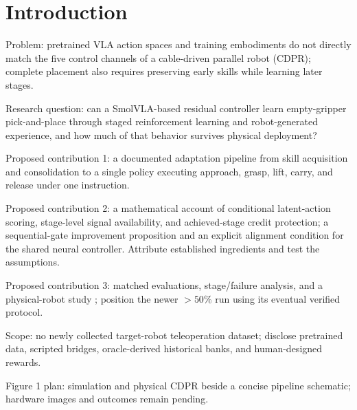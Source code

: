 \section{Introduction}\label{sec:introduction}
\begin{outline}
\item Problem: pretrained VLA action spaces and training embodiments do not directly match the five control channels of a cable-driven parallel robot (CDPR); complete placement also requires preserving early skills while learning later stages.
\item Research question: can a SmolVLA-based residual controller learn empty-gripper pick-and-place through staged reinforcement learning and robot-generated experience, and how much of that behavior survives physical deployment?
\item Proposed contribution 1: a documented adaptation pipeline from skill acquisition and consolidation to a single policy executing approach, grasp, lift, carry, and release under one instruction.
\item Proposed contribution 2: a mathematical account of conditional latent-action scoring, stage-level signal availability, and achieved-stage credit protection; a sequential-gate improvement proposition and an explicit alignment condition for the shared neural controller. Attribute established ingredients and test the assumptions.
\item Proposed contribution 3: matched evaluations, stage/failure analysis, and a physical-robot study ; position the newer $>50\%$ run using its eventual verified protocol.
\item Scope: no newly collected target-robot teleoperation dataset; disclose pretrained data, scripted bridges, oracle-derived historical banks, and human-designed rewards.
\item Figure 1 plan: simulation and physical CDPR beside a concise pipeline schematic; hardware images and outcomes remain pending.
\end{outline}
